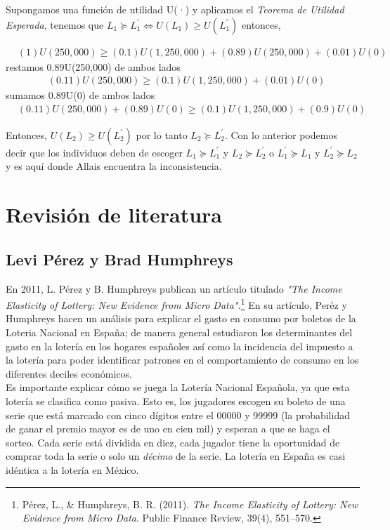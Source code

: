Supongamos una función de utilidad U(·) y aplicamos el \textit{Teorema de Utilidad Esperada}, tenemos que $L_1 \succeq L^{\prime}_1 \Leftrightarrow U(L_1) \geq U(L^{\prime}_1)$ entonces,

\begin{align*}
    & (1)U(250,000) \geq (0.1)U(1,250,000)+(0.89)U(250,000)+(0.01)U(0)
\end{align*}
\noindent restamos 0.89U(250,000) de ambos lados
\begin{align*}
    & (0.11)U(250,000) \geq (0.1)U(1,250,000) + (0.01)U(0)
\end{align*}
\noindent sumamos 0.89U(0) de ambos lados
\begin{align*}
    & (0.11)U(250,000) + (0.89)U(0) \geq (0.1)U(1,250,000) + (0.9)U(0) 
\end{align*}

Entonces, $U(L_2) \geq U(L^{\prime}_2)$ por lo tanto $L_2 \succeq L^{\prime}_2$. Con lo anterior podemos decir que los individuos deben de escoger $L_1 \succeq L^{\prime}_1$ y $L_2 \succeq L^{\prime}_2$ o $L^{\prime}_1 \succeq L_1$ y $L^{\prime}_2 \succeq L_2$ y es aquí donde Allais encuentra la inconsistencia.

\newpage

\section{Revisión de literatura}

\subsection{Levi Pérez y Brad Humphreys} 

En 2011, L. Pérez y B. Humphreys publican un artículo titulado \textit{"The Income Elasticity of Lottery: New Evidence from Micro Data".}\footnote{Pérez, L., \& Humphreys, B. R. (2011). \textit{The Income Elasticity of Lottery: New Evidence from Micro Data}. Public Finance Review, 39(4), 551–570.} En su artículo, Peréz y Humphreys hacen un análisis para explicar el gasto en consumo por boletos de la Loteria Nacional en España; de manera general estudiaron los determinantes del gasto en la lotería en los hogares españoles así como la incidencia del impuesto a la lotería para poder identificar patrones en el comportamiento de consumo en los diferentes deciles económicos. \\

Es importante explicar cómo se juega la Lotería Nacional Española, ya que esta lotería se clasifica como pasiva. Esto es, los jugadores escogen su boleto de una serie que está marcado con cinco dígitos entre el 00000 y 99999 (la probabilidad de ganar el premio mayor es de uno en cien mil) y esperan a que se haga el sorteo. Cada serie está dividida en diez, cada jugador tiene la oportunidad de comprar toda la serie o solo un \textit{décimo} de la serie. La lotería en España es casi idéntica a la lotería en México. \\


